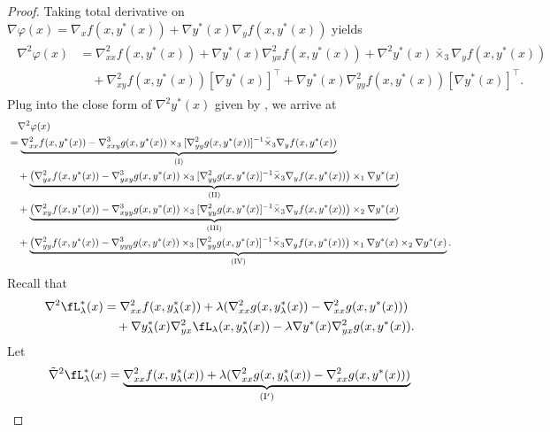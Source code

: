 \begin{proof}
    Taking total derivative on $ \nabla \varphi(x) = \nabla_x f(x,y^*(x)) + \nabla y^*(x) \nabla_y f(x,y^*(x))$ yields
    \begin{align} \label{eq:phi-hess}
\begin{split}
    \nabla^2 \varphi(x) &= \nabla_{xx}^2 f(x,y^*(x)) + \nabla y^*(x) \nabla_{yx}^2 f(x,y^*(x))  + \nabla^2 y^*(x) \bar \times_3 \nabla_y f(x,y^*(x)) \\
    &\quad + \nabla_{xy}^2f(x,y^*(x)) [\nabla y^*(x)]^\top + \nabla y^*(x) \nabla_{yy}^2 f(x,y^*(x)) [\nabla y^*(x)]^\top.
\end{split}
\end{align}
Plug into the close form of $\nabla^2 y^*(x)$ given by , we arrive at
    \begin{align*}
    &\quad \nabla^2 \varphi(x) \\
    &= \underbrace{\nabla_{xx }^2  f(x,y^*(x)) - \nabla_{xxy}^3 g(x,y^*(x)) \times_3 [  \nabla_{yy}^2 g(x,y^*(x))]^{-1} \bar \times_3 \nabla_y f(x,y^*(x)) }_{\rm (I)} \\
    &\quad +  
    \underbrace{  \left(\nabla_{yx}^2 f(x,y^*(x)) - \nabla_{yxy}^3 g(x,y^*(x)) \times_3 [\nabla_{yy}^2 g(x,y^*(x)]^{-1}  \bar \times_3 \nabla_y f(x,y^*(x)) \right) \times_1 \nabla y^*(x)  }_{\rm (II)}  \\
    &\quad +  
    \underbrace{  \left(\nabla_{xy}^2 f(x,y^*(x)) - \nabla_{xyy}^3 g(x,y^*(x)) \times_3 [\nabla_{yy}^2 g(x,y^*(x)]^{-1}  \bar \times_3 \nabla_y f(x,y^*(x)) \right) \times_2 \nabla y^*(x)  }_{\rm (III)}  \\
    &\quad + \underbrace{  \left( \nabla_{yy}^2 f(x,y^*(x)) -  \nabla_{yyy}^3 g(x,y^*(x)) \times_3 [\nabla_{yy}^2 g(x,y^*(x)]^{-1} \bar \times_3 \nabla_y f(x,y^*(x))   \right) \times_1 \nabla y^*(x) \times_2 \nabla y^*(x) }_{\rm (IV)}. 
\end{align*}
Recall that
\begin{align*}
    \nabla^2 \fL_{\lambda}^*(x) &= \nabla_{xx}^2  f(x,y_{\lambda}^*(x)) +  \lambda ( \nabla_{xx}^2 g(x,y_{\lambda}^*(x)) - \nabla_{xx}^2 g(x,y^*(x))) \\
    &\quad + \nabla y_{\lambda}^*(x) \nabla_{yx}^2 \fL_{\lambda}(x,y_{\lambda}^*(x))
    - \lambda \nabla y^*(x) \nabla_{yx}^2 g(x,y^*(x)) .
\end{align*}
Let
\begin{align*}
    \tilde \nabla^2 \fL_{\lambda}^*(x) &= \underbrace{\nabla_{xx}^2  f(x,y_{\lambda}^*(x)) +  \lambda ( \nabla_{xx}^2 g(x,y_{\lambda}^*(x)) - \nabla_{xx}^2 g(x,y^*(x)))}_{\rm (I')}\\

\end{align*}
\end{proof}
